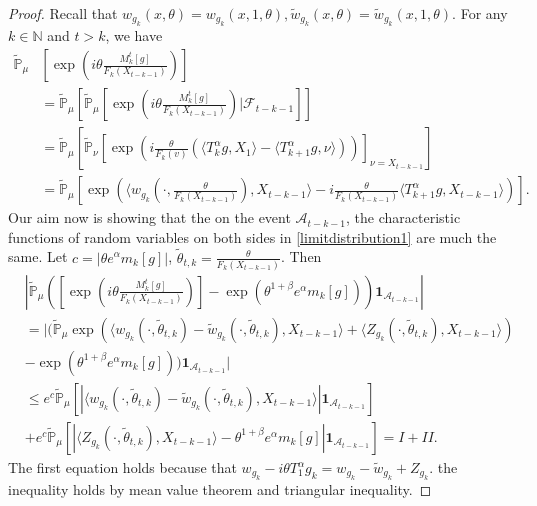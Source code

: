 \documentclass[12pt, a4paper]{amsart}
\theoremstyle{definition}
\numberwithin{equation}{section}
\begin{document}
\begin{proof}
    Recall that $w_{g_k}(x,\theta)=w_{g_k}(x,1,\theta),\tilde{w}_{g_k}(x,\theta)=\tilde{w}_{g_k}(x,1,\theta)$. For any $k\in\mathbb{N}$ and $t>k$, we have
    \begin{align*}
        \mathbb{\tilde{P}}_{\mu}&[\exp(i\theta\frac {M_k^t[g]}{F_k(X_{t-k-1})})]\\
        &=\mathbb{\tilde{P}}_{\mu}\left[\mathbb{\tilde{P}}_{\mu}[\exp(i\theta\frac{M_k^t[g]}{F_k(X_{t-k-1})})|\mathcal{F}_{t-k-1}]\right]\\
        &=\mathbb{\tilde{P}}_{\mu}\left[\mathbb{\tilde{P}}_{\nu}\left[\exp\left(i\frac{\theta}{F_k(v)}(\langle T_k^{\alpha}g,X_1\rangle-\langle T_{k+1}^{\alpha}g,\nu\rangle)\right)\right]_{\nu=X_{t-k-1}}\right]\\
        &=\mathbb{\tilde{P}}_{\mu}\left[\exp\left(\langle w_{g_k}(\cdot,\frac{\theta}{F_k(X_{t-k-1})}),X_{t-k-1}\rangle-i\frac{\theta}{F_k(X_{t-k-1})}\langle T_{k+1}^{\alpha}g, X_{t-k-1}\rangle\right)\right].
    \end{align*}
    Our aim now is showing that the on the event $\mathcal{A}_{t-k-1}$, the characteristic functions of random variables on both sides in \eqref{limitdistribution1} are much the same. Let $c=|\theta e^{\alpha}m_k[g]|$, $\tilde{\theta}_{t,k}=\frac{\theta}{F_k(X_{t-k-1})}$. Then
    \begin{align*}
        &\left|\mathbb{\tilde{P}}_{\mu}\left([\exp(i\theta \frac {M_k^t[g]}{F_k(X_{t-k-1})})]-\exp(\theta^{1+\beta}e^{\alpha}m_k[g])\right)\mathbf{1}_{\mathcal{A}_{t-k-1}}\right|\\
        &=\bigg|\big(\mathbb{\tilde{P}}_{\mu}\exp(\langle w_{g_k}(\cdot,\tilde{\theta}_{t,k})-\tilde{w}_{g_k}(\cdot, \tilde{\theta}_{t,k}),X_{t-k-1}\rangle+\langle Z_{g_k}(\cdot,\tilde{\theta}_{t,k}),X_{t-k-1}\rangle)\\
        &-\exp(\theta^{1+\beta}e^{\alpha}m_k[g])\big)\mathbf{1}_{\mathcal{A}_{t-k-1}}\bigg|\\
        &\leq e^c\mathbb{\tilde{P}}_{\mu}\left[\left|\langle w_{g_k}(\cdot,\tilde{\theta}_{t,k})-\tilde{w}_{g_k}(\cdot,\tilde{\theta}_{t,k}), X_{t-k-1}\rangle\right|\mathbf{1}_{\mathcal{A}_{t-k-1}}\right]\\
        &+e^c\mathbb{\tilde{P}}_{\mu}\left[\left|\langle Z_{g_k}(\cdot,\tilde{\theta}_{t,k}),X_{t-k-1}\rangle-\theta^{1+\beta}e^{\alpha}m_k[g]\right|\mathbf{1}_{\mathcal{A}_{t-k-1}}\right]=I+II.
    \end{align*}
    The first equation holds because that $w_{g_k}-i\theta T_1^{\alpha}g_k=w_{g_k}-\tilde{w}_{g_k}+Z_{g_k}$. the inequality holds by mean value theorem and triangular inequality.


\end{proof}
\end{document}
